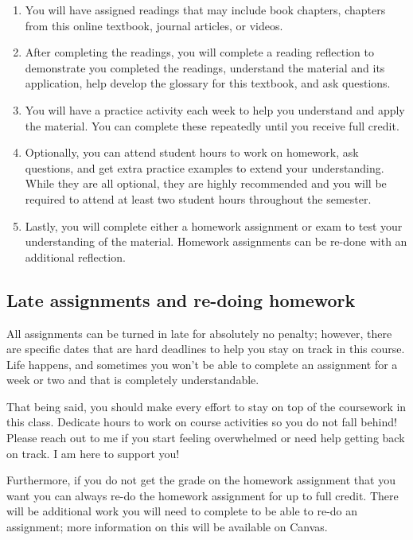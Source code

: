 \documentclass[
]{book}
\providecommand{\tightlist}{%
  \setlength{\itemsep}{0pt}\setlength{\parskip}{0pt}}
\begin{document}
\begin{enumerate}
\def\labelenumi{\arabic{enumi}.}
\tightlist
\item
  You will have assigned readings that may include book chapters, chapters from this online textbook, journal articles, or videos.
\item
  After completing the readings, you will complete a reading reflection to demonstrate you completed the readings, understand the material and its application, help develop the glossary for this textbook, and ask questions.
\item
  You will have a practice activity each week to help you understand and apply the material. You can complete these repeatedly until you receive full credit.
\item
  Optionally, you can attend student hours to work on homework, ask questions, and get extra practice examples to extend your understanding. While they are all optional, they are highly recommended and you will be required to attend at least two student hours throughout the semester.
\item
  Lastly, you will complete either a homework assignment or exam to test your understanding of the material. Homework assignments can be re-done with an additional reflection.
\end{enumerate}

\hypertarget{late-assignments-and-re-doing-homework}{%
\subsection{Late assignments and re-doing homework}\label{late-assignments-and-re-doing-homework}}

All assignments can be turned in late for absolutely no penalty; however, there are specific dates that are hard deadlines to help you stay on track in this course. Life happens, and sometimes you won't be able to complete an assignment for a week or two and that is completely understandable.

That being said, you should make every effort to stay on top of the coursework in this class. Dedicate hours to work on course activities so you do not fall behind! Please reach out to me if you start feeling overwhelmed or need help getting back on track. I am here to support you!

Furthermore, if you do not get the grade on the homework assignment that you want you can always re-do the homework assignment for up to full credit. There will be additional work you will need to complete to be able to re-do an assignment; more information on this will be available on Canvas.
\end{document}
